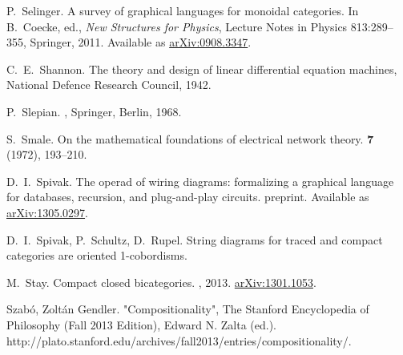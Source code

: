 \begin{thebibliography}{RSW00}
    P.\ Selinger.
    \newblock A survey of graphical languages
    for monoidal categories.
    \newblock In B.\ Coecke, ed., \emph{New Structures for
    Physics}, Lecture Notes in Physics 813:289--355, Springer, 2011.
    \newblock Available
    as \href{http://arxiv.org/abs/0908.3347}{arXiv:0908.3347}.

    C.\ E.\ Shannon.
    \newblock The theory and design of linear differential equation machines, National Defence Research Council, 1942.


    P.\ Slepian.
    , Springer, Berlin, 1968. 

    S.\ Smale.
    \newblock On the mathematical foundations of electrical
    network theory.
     {\bf 7} (1972), 193--210. 




    D.\ I.\  Spivak.
    \newblock The operad of wiring diagrams:
    formalizing a graphical language for databases, recursion, and plug-and-play
    circuits.
    \newblock preprint.
    \newblock Available as
    \href{http://arxiv.org/abs/1305.0297}{arXiv:1305.0297}.

    D.\ I.\ Spivak, P.\ Schultz, D.\ Rupel.
    \newblock String diagrams for traced and compact categories are oriented 1-cobordisms.

    M.\ Stay.
    \newblock Compact closed bicategories.
    , 2013. 
    \newblock \href{http://arxiv.org/abs/1301.1053}{arXiv:1301.1053}.

    Szab\'o, Zolt\'an Gendler.
    \newblock "Compositionality", The Stanford Encyclopedia of Philosophy
    (Fall 2013 Edition), Edward N. Zalta (ed.).
    \newblock
    http://plato.stanford.edu/archives/fall2013/entries/compositionality/.


\end{thebibliography}
